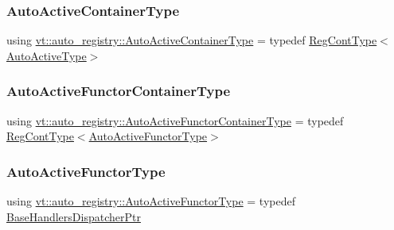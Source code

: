 \mbox{\label{namespacevt_1_1auto__registry_a08dc8b065a2c2fd466ae6299eb9ca6b9}} 
\subsubsection{\texorpdfstring{Auto\+Active\+Container\+Type}{AutoActiveContainerType}}
{\footnotesize\ttfamily using \hyperlink{namespacevt_1_1auto__registry_a08dc8b065a2c2fd466ae6299eb9ca6b9}{vt\+::auto\+\_\+registry\+::\+Auto\+Active\+Container\+Type} = typedef \hyperlink{namespacevt_1_1auto__registry_a988a4943e4c8fe82b56f5b13bddceb2b}{Reg\+Cont\+Type}$<$\hyperlink{namespacevt_1_1auto__registry_a2c91a60d4d3c0d80a563c3d4f54162eb}{Auto\+Active\+Type}$>$}

\mbox{\label{namespacevt_1_1auto__registry_abe0cefefe73cf87e520a5ab3ebc88f4a}} 
\subsubsection{\texorpdfstring{Auto\+Active\+Functor\+Container\+Type}{AutoActiveFunctorContainerType}}
{\footnotesize\ttfamily using \hyperlink{namespacevt_1_1auto__registry_abe0cefefe73cf87e520a5ab3ebc88f4a}{vt\+::auto\+\_\+registry\+::\+Auto\+Active\+Functor\+Container\+Type} = typedef \hyperlink{namespacevt_1_1auto__registry_a988a4943e4c8fe82b56f5b13bddceb2b}{Reg\+Cont\+Type}$<$\hyperlink{namespacevt_1_1auto__registry_a092979b3ed6cf9e21e6a5823fdaa0c12}{Auto\+Active\+Functor\+Type}$>$}

\mbox{\label{namespacevt_1_1auto__registry_a092979b3ed6cf9e21e6a5823fdaa0c12}} 
\subsubsection{\texorpdfstring{Auto\+Active\+Functor\+Type}{AutoActiveFunctorType}}
{\footnotesize\ttfamily using \hyperlink{namespacevt_1_1auto__registry_a092979b3ed6cf9e21e6a5823fdaa0c12}{vt\+::auto\+\_\+registry\+::\+Auto\+Active\+Functor\+Type} = typedef \hyperlink{namespacevt_1_1auto__registry_a0166496b1137bbc1b20adfeb5e19cf0e}{Base\+Handlers\+Dispatcher\+Ptr}}

